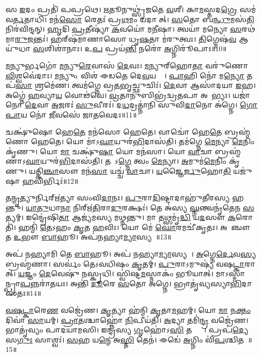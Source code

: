 𑌸 \ul{𑌇}𑌦𑌂 𑌪𑍍𑌰𑌤𑌿॑ 𑌪𑌪𑍍𑌰𑌥𑍇।
\ul{𑌋}𑌤𑍂𑌨𑍁𑌥𑍍𑌸𑍃॑𑌜𑌤𑍇 \ul{𑌵}𑌶𑍀।
𑌕𑌾\ul{𑌮}𑌸𑍍𑌤𑌦\ul{𑌗𑍍𑌰𑍇} 𑌸𑌮॑𑌵\ul{𑌰𑍍𑌤}𑌤𑌾𑌧𑌿॑।
𑌮𑌨॑\ul{𑌸𑍋} 𑌰𑍇𑌤𑌃॑ 𑌪𑍍𑌰\ul{𑌥}𑌮𑌂 𑌯𑌦𑌾𑌸𑍀᳚𑌤𑍍।
\ul{𑌸}𑌤𑍋 𑌬\ul{𑌨𑍍𑌧𑍁}𑌮𑌸॑\ul{𑌤𑌿} 𑌨𑌿𑌰॑𑌵𑌿𑌨𑍍𑌦𑌨𑍍।
\ul{𑌹𑍃}𑌦𑌿 \ul{𑌪𑍍𑌰}𑌤𑍀𑌷𑍍𑌯𑌾॑ \ul{𑌕}𑌵𑌯𑍋॑ 𑌮\ul{𑌨𑍀}𑌷𑌾।
𑌤𑍍𑌵𑌯𑌾॑ 𑌮𑌨𑍍𑌯𑍋 \ul{𑌸}𑌰𑌥॑𑌮𑌾\ul{𑌰𑍁}𑌜𑌨𑍍𑌤𑌃॑।
𑌹𑌰𑍍‌\mbox{}𑌷॑𑌮𑌾𑌣𑌾𑌸𑍋 𑌧𑍃\ul{𑌷}𑌤𑌾 𑌮॑𑌰𑍁𑌤𑍍𑌵𑌃।
\ul{𑌤𑌿}𑌗𑍍𑌮𑍇𑌷॑\ul{𑌵} 𑌆𑌯𑍁॑𑌧𑌾 \ul{𑌸}\ul{}𑌶𑌿𑌶𑌾॑𑌨𑌾𑌃।
𑌉\ul{𑌪} 𑌪𑍍𑌰𑌯॑\ul{𑌨𑍍𑌤𑌿} 𑌨𑌰𑍋॑ \ul{𑌅}𑌗𑍍𑌨𑌿𑌰𑍂॑𑌪𑌾𑌃॥10॥

\ul{𑌮}𑌨𑍍𑌯𑍁𑌰𑍍𑌭𑌗𑍋॑ \ul{𑌮}𑌨𑍍𑌯𑍁\ul{𑌰𑍇}𑌵𑌾𑌸॑ \ul{𑌦𑍇}𑌵𑌃।
\ul{𑌮}𑌨𑍍𑌯𑍁𑌰𑍍‌\mbox{}𑌹𑍋\ul{𑌤𑌾} 𑌵𑌰𑍁॑𑌣𑍋 \ul{𑌵𑌿}𑌶𑍍𑌵𑌵𑍇॑𑌦𑌾𑌃।
\ul{𑌮}𑌨𑍍𑌯𑍁𑌂 𑌵𑌿𑌶॑ 𑌈𑌡𑌤𑍇 𑌦𑍇\ul{𑌵}𑌯𑌨𑍍𑌤𑍀𑌃᳚।
\ul{𑌪𑌾}𑌹𑌿 𑌨𑍋॑ 𑌮\ul{𑌨𑍍𑌯𑍋} 𑌤𑌪॑\ul{𑌸𑌾} 𑌶𑍍𑌰𑌮𑍇॑𑌣।
𑌤𑍍𑌵𑌮॑𑌗𑍍𑌨𑍇 𑌵𑍍𑌰\ul{𑌤}𑌭𑍃𑌚𑍍𑌛𑍁𑌚𑌿𑌃॑।
\ul{𑌦𑍇}𑌵𑌾 𑌆𑌸𑌾॑𑌦𑌯𑌾 \ul{𑌇}𑌹।
𑌅𑌗𑍍𑌨𑍇॑ \ul{𑌹}𑌵𑍍𑌯𑌾\ul{𑌯} 𑌵𑍋𑌢॑𑌵𑍇।
\ul{𑌵𑍍𑌰}𑌤𑌾𑌨𑍁𑌬𑌿𑌭𑍍𑌰॑𑌦𑍍𑌵𑍍𑌰\ul{𑌤}𑌪𑌾 𑌅𑌦𑌾᳚𑌭𑍍𑌯𑌃।
𑌯𑌜𑌾॑ 𑌨𑍋 \ul{𑌦𑍇}𑌵𑌾 \ul{𑌅}𑌜𑌰𑌃॑ \ul{𑌸𑍁}𑌵𑍀𑌰𑌃॑।
𑌦\ul{𑌧}𑌦𑍍𑌰𑌤𑍍𑌨𑌾॑𑌨𑌿 𑌸𑍁𑌵𑌿\ul{𑌦𑌾}𑌨𑍋 𑌅॑𑌗𑍍𑌨𑍇।
\ul{𑌗𑍋}\ul{𑌪𑌾}𑌯 𑌨𑍋॑ \ul{𑌜𑍀}𑌵𑌸𑍇॑ 𑌜𑌾𑌤𑌵𑍇𑌦𑌃॥11॥

𑌚𑌕𑍍𑌷𑍁॑𑌷𑍋 𑌹𑍇\ul{𑌤𑍇} 𑌮𑌨॑𑌸𑍋 𑌹𑍇𑌤𑍇।
𑌵𑌾𑌚𑍋॑ 𑌹𑍇\ul{𑌤𑍇} 𑌬𑍍𑌰𑌹𑍍𑌮॑𑌣𑍋 𑌹𑍇𑌤𑍇।
𑌯𑍋 𑌮𑌾॑\-𑌽\ul{𑌘𑌾}𑌯𑍁𑌰॑\ul{𑌭𑌿}𑌦𑌾𑌸॑𑌤𑌿।
𑌤𑌮॑𑌗𑍍𑌨𑍇 \ul{𑌮𑍇}𑌨𑍍𑌯𑌾 \ul{𑌮𑍇}𑌨𑌿𑌂 𑌕𑍃॑𑌣𑍁।
𑌯𑍋 \ul{𑌮𑌾} 𑌚𑌕𑍍𑌷𑍁॑\ul{𑌷𑌾} 𑌯𑍋 𑌮𑌨॑𑌸𑌾।
𑌯𑍋 \ul{𑌵𑌾}𑌚𑌾 𑌬𑍍𑌰𑌹𑍍𑌮॑𑌣𑌾\-𑌽\ul{𑌘𑌾}𑌯𑍁𑌰॑\ul{𑌭𑌿}𑌦𑌾𑌸॑𑌤𑌿।
𑌤𑌯𑌾᳚𑌽\ul{𑌗𑍍𑌨𑍇} 𑌤𑍍𑌵𑌂 \ul{𑌮𑍇}𑌨𑍍𑌯𑌾।
\ul{𑌅}𑌮𑍁𑌮॑\ul{𑌮𑍇}𑌨𑌿𑌂 𑌕𑍃॑𑌣𑍁।
𑌯𑌤𑍍𑌕𑌿\ul{𑌞𑍍𑌚𑌾}𑌸𑍗 𑌮𑌨॑\ul{𑌸𑌾} 𑌯𑌚𑍍𑌚॑ \ul{𑌵𑌾}𑌚𑌾।
\ul{𑌯}𑌜𑍍𑌞𑍈\ul{𑌰𑍍𑌜𑍁}𑌹𑍋\ul{𑌤𑌿} 𑌯𑌜𑍁॑𑌷𑌾 \ul{𑌹}𑌵𑌿𑌰𑍍𑌭𑌿𑌃॑॥12॥

𑌤\ul{𑌨𑍍𑌮𑍃}𑌤𑍍𑌯𑍁𑌰𑍍𑌨𑌿𑌰𑍍\mbox{}𑌋॑𑌤𑍍𑌯𑌾 𑌸𑌂𑌵𑌿\ul{𑌦𑌾}𑌨𑌃।
\ul{𑌪𑍁}𑌰𑌾\ul{𑌦𑌿}𑌷𑍍𑌟𑌾𑌦𑌾𑌹𑍁॑𑌤𑍀𑌰𑌸𑍍𑌯 𑌹𑌨𑍍𑌤𑍁।
\ul{𑌯𑌾}\ul{𑌤𑍁}𑌧𑌾\ul{𑌨𑌾} 𑌨𑌿𑌰𑍍\mbox{}𑌋॑\ul{𑌤𑌿}𑌰𑌾\ul{𑌦𑍁}𑌰𑌕𑍍𑌷𑌃॑।
𑌤𑍇 𑌅॑𑌸𑍍𑌯 \ul{𑌘𑍍𑌨}𑌨𑍍𑌤𑍍𑌵𑌨𑍃॑𑌤𑍇𑌨 \ul{𑌸}𑌤𑍍𑌯𑌮𑍍।
𑌇𑌨𑍍𑌦𑍍𑌰𑍇॑𑌷𑌿\ul{𑌤𑌾} 𑌆𑌜𑍍𑌯॑𑌮𑌸𑍍𑌯 𑌮𑌥𑍍𑌨𑌨𑍍𑌤𑍁।
𑌮𑌾 𑌤𑌥𑍍𑌸𑌮𑍃॑\ul{𑌦𑍍𑌧𑌿} 𑌯\ul{𑌦}𑌸𑍗 \ul{𑌕}𑌰𑍋𑌤𑌿॑।
𑌹𑌨𑍍𑌮𑌿॑ \ul{𑌤𑍇}𑌽𑌹𑌂 \ul{𑌕𑍃}𑌤 \ul{𑌹}𑌵𑌿𑌃।
𑌯𑍋 𑌮𑍇॑ \ul{𑌘𑍋}𑌰𑌮𑌚𑍀॑𑌕𑍃𑌤𑌃।
𑌅𑌪𑌾᳚𑌞𑍍𑌚𑍗 𑌤 \ul{𑌉}𑌭𑍗 \ul{𑌬𑌾}𑌹𑍂।
𑌅𑌪॑𑌨𑌹𑍍𑌯𑌾\ul{𑌮𑍍𑌯𑌾}𑌸𑍍𑌯𑌮𑍍᳚॥13॥

𑌅𑌪॑ 𑌨𑌹𑍍𑌯𑌾𑌮𑌿 𑌤𑍇 \ul{𑌬𑌾}𑌹𑍂।
𑌅𑌪॑ 𑌨𑌹𑍍𑌯𑌾\ul{𑌮𑍍𑌯𑌾}𑌸𑍍𑌯𑌮𑍍᳚।
\ul{𑌅}𑌗𑍍𑌨𑍇\ul{𑌰𑍍𑌦𑍇}𑌵\ul{𑌸𑍍𑌯} 𑌬𑍍𑌰𑌹𑍍𑌮॑𑌣𑌾।
𑌸𑌰𑍍𑌵𑌂॑ 𑌤𑍇𑌽𑌵𑌧𑌿𑌷𑌂 \ul{𑌕𑍃}𑌤𑌮𑍍।
\ul{𑌪𑍁}𑌰𑌾\-𑌽𑌮𑍁𑌷𑍍𑌯॑ 𑌵𑌷\ul{𑌟𑍍𑌕𑌾}𑌰𑌾𑌤𑍍।
\ul{𑌯}𑌜𑍍𑌞𑌂 \ul{𑌦𑍇}𑌵𑍇𑌷𑍁॑ 𑌨𑌸𑍍𑌕𑍃𑌧𑌿।
𑌸𑍍𑌵𑌿॑𑌷𑍍𑌟\ul{𑌮}𑌸𑍍𑌮𑌾𑌕𑌂॑ 𑌭𑍂𑌯𑌾𑌤𑍍।
𑌮𑌾𑌽𑌸𑍍𑌮𑌾𑌨𑍍𑌪𑍍𑌰𑌾\ul{𑌪}𑌨𑍍𑌨\-𑌰𑌾॑𑌤𑌯𑌃।
𑌅𑌨𑍍𑌤𑌿॑ \ul{𑌦𑍂}𑌰𑍇 \ul{𑌸}𑌤𑍋 𑌅॑𑌗𑍍𑌨𑍇।
𑌭𑍍𑌰𑌾𑌤𑍃॑𑌵𑍍𑌯𑌸𑍍𑌯𑌾\ul{𑌭𑌿}𑌦𑌾𑌸॑𑌤𑌃॥14॥

\ul{𑌵}\ul{𑌷}\ul{𑌟𑍍𑌕𑌾}𑌰𑍇\ul{𑌣} 𑌵𑌜𑍍𑌰𑍇॑𑌣।
\ul{𑌕𑍃}𑌤𑍍𑌯𑌾 𑌹॑𑌨𑍍𑌮𑌿 \ul{𑌕𑍃}𑌤𑌾\ul{𑌮}𑌹𑌮𑍍।
𑌯𑍋 \ul{𑌮𑌾} 𑌨\ul{𑌕𑍍𑌤𑌂} 𑌦𑌿𑌵𑌾॑ \ul{𑌸𑌾}𑌯𑌮𑍍।
\ul{𑌪𑍍𑌰𑌾}𑌤𑌶𑍍𑌚𑌾𑌹𑍍𑌨𑍋॑ \ul{𑌨𑌿}𑌪𑍀𑌯॑𑌤𑌿।
\ul{𑌅}𑌦𑍍𑌯𑌾 𑌤𑌮𑌿॑\ul{𑌨𑍍𑌦𑍍𑌰} 𑌵𑌜𑍍𑌰𑍇॑𑌣।
𑌭𑌾𑌤𑍃॑𑌵𑍍𑌯𑌂 𑌪𑌾𑌦𑌯𑌾𑌮𑌸𑌿।
𑌇𑌨𑍍𑌦𑍍𑌰॑𑌸𑍍𑌯 \ul{𑌗𑍃}𑌹𑍋॑𑌽\ul{𑌸𑌿} 𑌤𑌨𑍍𑌤𑍍𑌵𑌾᳚।
𑌪𑍍𑌰𑌪॑\ul{𑌦𑍍𑌯𑍇} 𑌸\ul{𑌗𑍁𑌃} 𑌸𑌾𑌶𑍍𑌵𑌃॑।
\ul{𑌸}𑌹 𑌯\ul{𑌨𑍍𑌮𑍇} 𑌅\ul{𑌸𑍍𑌤𑌿} 𑌤𑍇𑌨॑।
𑌈𑌡𑍇॑ \ul{𑌅}𑌗𑍍𑌨𑌿𑌂 𑌵𑌿॑\ul{𑌪}𑌶𑍍𑌚𑌿𑌤𑌮𑍍᳚॥15॥

